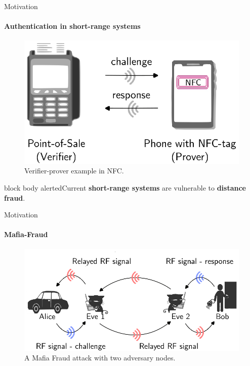 \begin{frame}{Motivation}
\framesubtitle{Authentication in short-range systems}

\begin{figure}
    \vspace{-1cm}
    \hspace*{-1.2cm}
    \includegraphics[scale=0.8]{slides/figures/NFC.eps}
    \caption{Verifier-prover example in NFC.}
    \label{fig:NFC}
\end{figure}
\vspace{-1cm}
\begin{beamercolorbox}[colsep=1.5pt,rounded=true,shadow=true]{block body alerted}{Current \textbf{short-range systems} are vulnerable to \textbf{distance fraud}.}
\end{beamercolorbox}
    
\end{frame}

\begin{frame}{Motivation}
\framesubtitle{Mafia-Fraud}
    \begin{figure}
    \hspace*{-2cm}
        \includegraphics[scale = 0.9]{slides/figures/mafia_fraud.eps}
        \caption{A Mafia Fraud attack with two adversary nodes.}
        \label{fig:enter-label}
    \end{figure}
\end{frame}

